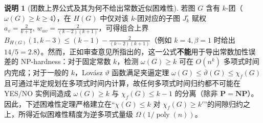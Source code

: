 \documentclass[11pt,a4paper]{ctexart}
\theoremstyle{definition}
\newtheorem{remark}[theorem]{说明}
\newcommand{\1}{\boldsymbol 1}
\newcommand{\0}{\boldsymbol 0}
\newcommand{\chif}{\chi_f}
\begin{document}
\begin{remark}[团数上界公式及其为何不给出常数近似困难性]\label{rem:lovasz_theta}
若图 $G$ 含有 $k$-团（$\omega(G)\ge k\ge 4$），在 $H(G)$ 中仅对该 $k$-团对应的子图 $J_k^\circ$ 赋权 $a_v=\frac{2}{k+1},\, w_{uv}=\frac{2}{(k-2)(k+1)}$，可得组合上界 $B_{H(G)}(1,k-3)\le (k-1)-\frac{2}{(k-2)(k+1)}$（例如 $k=4,\beta=1$ 时给出 $14/5=2.8$）。然而，正如审查意见所指出的，这一公式\textbf{不能}用于导出常数加性误差的 NP-hardness：对于固定常数 $k$，检测 $\omega(G)\ge k$ 可在 $O(n^k)$ 多项式时间内完成；对于一般的 $k$，Lov\'asz $\vartheta$ 函数满足夹逼定理 $\omega(G)\le\overline{\vartheta}(G)\le\chif(G)$ 且可通过半定规划在多项式时间内计算，故任何多项式时间归约都不可能在 YES/NO 实例间造成 $\omega(G)\ge k$ 与 $\chif(G)\le k-1$ 的分离（除非 $\mathbf{P}=\mathbf{NP}$）。因此，下述困难性定理严格建立在“$\chi(G)\le k$ 对 $\chif(G)\ge k'$”的间隙归约之上，所得近似困难性精度为逆多项式量级 $\Omega(1/\operatorname{poly}(n))$。
\end{remark}
\end{document}
